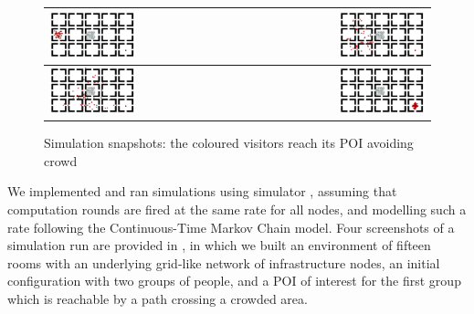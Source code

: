 \documentclass[12pt,a4paper,twoside,openright]{book}
\begin{document}
\begin{figure}[t]
\centering
\begin{tabular}{| l | r |}
\hline
\includegraphics[width=0.47\textwidth]{img/coordination-shot/1.png} &
\includegraphics[width=0.47\textwidth]{img/coordination-shot/2.png} \\
\hline
\includegraphics[width=0.47\textwidth]{img/coordination-shot/3.png} &
\includegraphics[width=0.47\textwidth]{img/coordination-shot/4.png} \\
\hline
\end{tabular}
\caption[Simulation of crowd sensitive gradient in $\sigma{}\tau{}$-Linda]{Simulation snapshots: the coloured visitors reach its POI avoiding crowd}
\label{img:linda-simulations}\vspace{-10pt}
\end{figure}
We implemented and ran simulations using \alchemist{} simulator \cite{mass2011}, assuming that computation rounds are fired at the same rate for all nodes, and modelling such a rate following the Continuous-Time Markov Chain model.
%
Four screenshots of a simulation run are provided in , in which we built an environment of fifteen rooms with an underlying grid-like network of infrastructure nodes, an initial configuration with two groups of people, and a POI of interest for the first group which is reachable by a path crossing a crowded area. 
\end{document}
